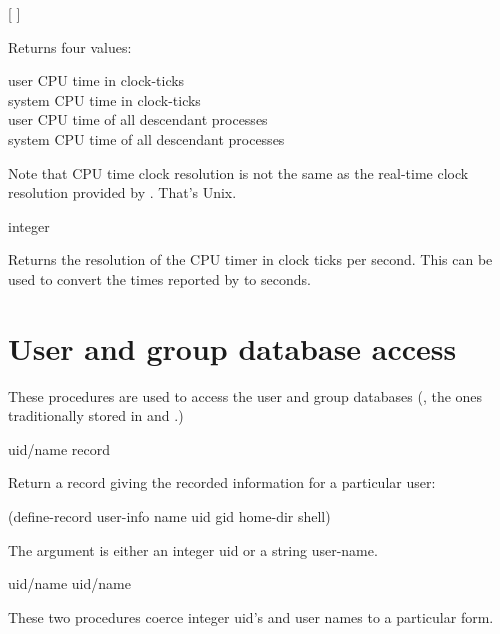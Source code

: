  {} {[{\fixnum} {\fixnum} {\fixnum} \fixnum]}
\begin{desc}
Returns four values:
\begin{tightinset}
\begin{flushleft}
        user CPU time in clock-ticks            \\
        system CPU time in clock-ticks          \\
        user CPU time of all descendant processes        \\
        system CPU time of all descendant processes
\end{flushleft}
\end{tightinset}
Note that CPU time clock resolution is not the same as 
the real-time clock resolution provided by .
That's Unix.
\end{desc}

 {integer}
\begin{desc}
Returns the resolution of the CPU timer in clock ticks per second.
This can be used to convert the times reported by 
to seconds.
\end{desc}


\section{User and group database access}
These procedures are used to access the user and group databases
(\eg, the ones traditionally stored in  and .)

  {uid/name}  {record}
\begin{desc}
    Return a  record giving the recorded information for a
particular user:
\begin{code}
(define-record user-info
  name uid gid home-dir shell)\end{code}
The  argument is either an integer uid or a string user-name.
\end{desc}

 {uid/name} \fixnum
{} {uid/name}  \str
\begin{desc}
These two procedures coerce integer uid's and user names to a particular
form.
\end{desc}

